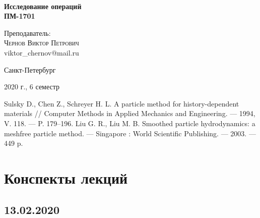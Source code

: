 \documentclass[aps,%
12pt,%
final,%
oneside,
onecolumn,%
musixtex, %
superscriptaddress,%
centertags]{article} %
\begin{document}
\begin{titlepage} 
\begin{center}
 
\textbf{}\\[10.0cm]
\textbf{\LARGE Исследование операций}\\[0.5cm]
\textbf{\Large ПМ-1701} \\[0.2cm]

\begin{center} \large
{Преподаватель:} \\[0.5cm]
\textsc {Чернов Виктор Петрович}\\
{viktor\_chernov@mail.ru}\\
\end{center}
\vfill 

{\large {Санкт-Петербург}} \par
{\large {2020 г., 6 семестр}}
\end{center} 
\end{titlepage}

\begin{thebibliography}{3}
Sulsky D., Chen Z., Schreyer H. L.  A particle method for history-dependent materials // Computer Methods in Applied Mechanics and Engineering. --- 1994, V. 118. --- P. 179--196.
Liu G. R., Liu M. B. Smoothed particle hydrodynamics: a meshfree particle method. --- Singapore : World Scientific Publishing. --- 2003. --- 449 p.
\end{thebibliography}
\tableofcontents
\newpage
\section{Конспекты лекций}
\subsection{13.02.2020} 
\end{document}
